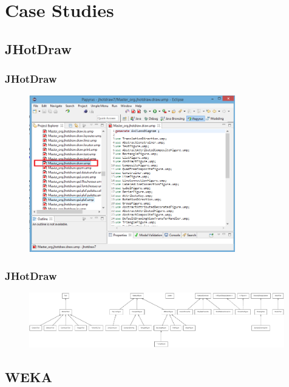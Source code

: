 \documentclass[xcolor=table]{beamer}
\begin{document}
\section{Case Studies}
\subsection{JHotDraw} 

\begin{frame}
\frametitle{JHotDraw}

\begin{figure}[h]
\centering
\includegraphics[width=0.80\textwidth]{Figures/jhotdrawMasterDraw.png} 
\end{figure}
\end{frame}

\begin{frame}
\frametitle{JHotDraw}
\begin{figure}[h]
\centering
\includegraphics[width=0.99\textwidth]{Figures/jhotdrawuml.pdf} 
\end{figure}

\end{frame}


\subsection{WEKA} 
\end{document}
